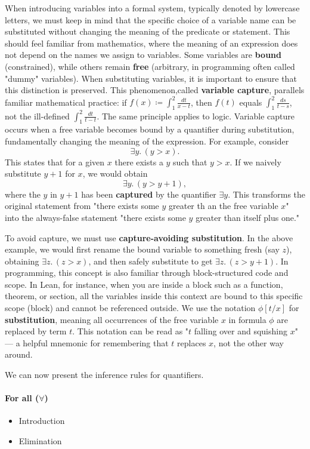 When introducing variables into a formal system, typically denoted by lowercase letters, 
we must keep in mind that the specific choice of a variable name can be substituted without 
changing the meaning of the predicate or statement. This should feel familiar from mathematics, 
where the meaning of an expression does not depend on the names we assign to variables.
Some variables are \textbf{bound} (constrained), while others remain \textbf{free} 
(arbitrary, in programming often called "dummy" variables). 
When substituting variables, it is important to ensure that this distinction is preserved.
This phenomenon,called \textbf{variable capture}, parallels familiar mathematical practice: 
if $f(x) \coloneqq \int_1^2 \frac{dt}{x-t}$, then $f(t)$ equals $\int_1^2 \frac{ds}{t-s}$,
 not the ill-defined $\int_1^2 \frac{dt}{t-t}$. The same principle applies to logic.
Variable capture occurs when a free variable becomes bound by a quantifier during substitution, 
fundamentally changing the meaning of the expression. For example, consider
\[
\exists y.\,(y > x).
\]
This states that for a given $x$ there exists a $y$ such that $y > x$. 
If we naively substitute $y+1$ for $x$, we would obtain
\[
\exists y.\,(y > y+1),
\]
where the $y$ in $y+1$ has been \textbf{captured} by the quantifier $\exists y$. 
This transforms the original statement from "there exists some $y$ greater th
an the free variable $x$" into the always-false statement 
"there exists some $y$ greater than itself plus one."

To avoid capture, we must use \textbf{capture-avoiding substitution}. 
In the above example, we would first rename the bound variable to something fresh 
(say $z$), obtaining $\exists z.\,(z > x)$, and then safely substitute to get $\exists z.\,(z > y+1)$.
In programming, this concept is also familiar through block-structured code and scope. 
In Lean, for instance, when you are inside a block such as a function, theorem, or section, 
all the variables inside this context are bound to this specific scope (block) and cannot 
be referenced outside. 
We use the notation $\phi[t/x]$ for \textbf{substitution}, meaning all occurrences of the free 
variable $x$ in formula $\phi$ are replaced by term $t$. This notation can be read as 
"$t$ falling over and squishing $x$" — a helpful mnemonic for remembering that $t$ replaces $x$, 
not the other way around.

We can now present the inference rules for quantifiers.

\paragraph{For all ($\forall$)}
\begin{itemize}
    \item Introduction
    \begin{prooftree}
    \end{prooftree}
    \item Elimination
    \begin{prooftree}
    \end{prooftree}
\end{itemize}
